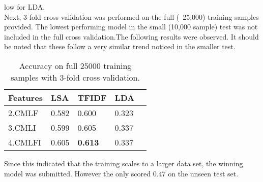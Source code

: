 \documentclass[11pt]{article}
\begin{document}
low for LDA.\\
Next, 3-fold cross validation was performed on the full (~25,000) training
samples provided.  The lowest performing
model in the small (10,000 sample) test was not included in the full cross
validation.The following results were observed. It should be noted that these
follow a very similar trend noticed in the smaller test.\\
\begin{table}[h]
\begin{center}
\begin{singlespace}
\begin{tabular}{|l|l|l|l|l|}
\hline \bf Features & \bf LSA & \bf TFIDF  & \bf LDA \\ \hline
2.CMLF &0.582 & 0.600&0.323\\
3.CMLI & 0.599 & 0.605&0.337\\
4.CMLFI&0.605&\bf{0.613} &0.337 \\
\hline
\end{tabular}
\end{singlespace}
\end{center}
\caption{ Accuracy on full 25000 training samples with 3-fold cross validation.}
\end{table}
Since this indicated that the training scales to a larger data set, the winning
model was submitted. However the only scored 0.47 on the unseen test set.

{} 
\end{document}

